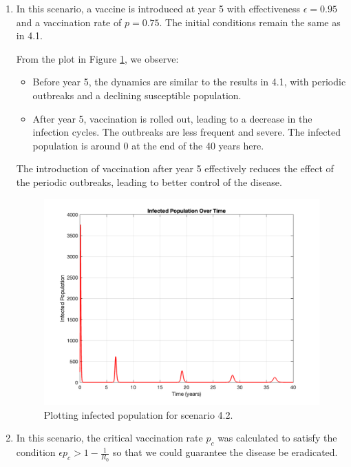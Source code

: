 \documentclass[12pt]{article}
\begin{document}
\begin{enumerate}
\begin{enumerate}
  \item In this scenario, a vaccine is introduced at year 5 with effectiveness \( \epsilon = 0.95 \) and a vaccination rate of \( p = 0.75 \). The initial conditions remain the same as in 4.1.

  From the plot in Figure \ref{fig:figure42}, we observe:
  \begin{itemize}
      \item Before year 5, the dynamics are similar to the results in 4.1, with periodic outbreaks and a declining susceptible population.
      \item After year 5, vaccination is rolled out, leading to a decrease in the infection cycles. The outbreaks are less frequent and severe. The infected population is around 0 at the end of the 40 years here.
  \end{itemize}
  
  The introduction of vaccination after year 5 effectively reduces the effect of the periodic outbreaks, leading to better control of the disease.

  \begin{figure}[H]
    \centering
    \includegraphics[width=\textwidth]{Figures/figure42.png}
    \caption{Plotting infected population for scenario 4.2.}
    \label{fig:figure42}
  \end{figure}

  \item In this scenario, the critical vaccination rate \( p_c \) was calculated to satisfy the condition \( \epsilon p_c > 1 - \frac{1}{R_0} \) so that we could guarantee the disease be eradicated.


\end{enumerate}
\end{enumerate}
\end{document}

